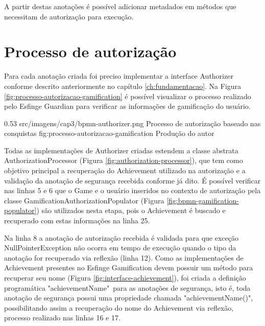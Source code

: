 \par A partir destas anotações é possível adicionar metadados em métodos que necessitam de autorização para execução.

\section{Processo de autorização}

\par Para cada anotação criada foi preciso implementar a interface Authorizer conforme descrito anteriormente no capítulo \ref{ch:fundamentacao}. Na Figura \ref{fig:processo-autorizacao-gamification} é possível visualizar o processo realizado pelo Esfinge Guardian para verificar as informações de gamificação do usuário.

\begin{image}
{0.53}
{src/imagens/cap3/bpmn-authorizer.png}
{Processo de autorização baseado nas conquistas}
{fig:processo-autorizacao-gamification}
{Produção do autor}
\end{image}


\par Todas as implementações de Authorizer criadas estendem a classe abstrata AuthorizationProcessor (Figura \ref{fig:authorization-processor}), que tem como objetivo principal a recuperação do Achievement utilizado na autorização e a validação da anotação de segurança recebida conforme já dito. É possível verificar nas linhas 5 e 6 que o Game e o usuário inseridos no contexto de autorização pela classe GamificationAuthorizationPopulator (Figura \ref{fig:bpmn-gamification-populator}) são utilizados nesta etapa, pois o Achievement é buscado e recuperado com estas informações na linha 25.
\par Na linha 8 a anotação de autorização recebida é validada para que exceção NullPointerException não ocorra em tempo de execução quando o tipo da anotação for recuperado via reflexão (linha 12). Como as implementações de Achievement presentes no Esfinge Gamification devem possuir um método para recuperar seu nome (Figura \ref{fig:interface-achievement}), foi criada a definição programática "achievementName"\ para as anotações de segurança, isto é, toda anotação de segurança possui uma propriedade chamada "achievementName()", possibilitando assim a recuperação do nome do Achievement via reflexão, processo realizado nas linhas 16 e 17.

